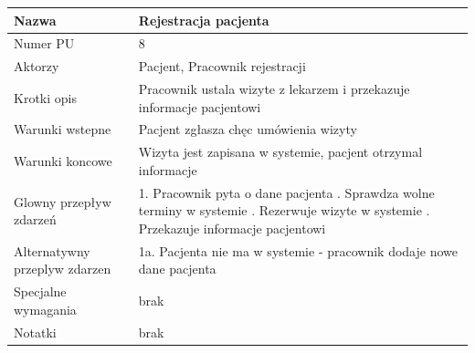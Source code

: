 \documentclass{article}
\begin{document}
\noindent
\begin{tabular}{|m{10em}|m{30em}|}
        \hline
        Nazwa & Rejestracja pacjenta \\
        \hline
        Numer PU & 8\\
        \hline
        Aktorzy & Pacjent, Pracownik rejestracji\\
        \hline
        Krotki opis & Pracownik ustala wizyte z lekarzem i przekazuje informacje pacjentowi\\
        \hline
        Warunki wstepne & Pacjent zgłasza chęc umówienia wizyty\\
        \hline
        Warunki koncowe & Wizyta jest zapisana w systemie, pacjent otrzymal informacje\\
        \hline
        Glowny przepływ zdarzeń & 1. Pracownik pyta o dane pacjenta \newline
                                 2. Sprawdza wolne terminy w systemie \newline
                                 3. Rezerwuje wizyte w systemie \newline
                                 4. Przekazuje informacje pacjentowi  \\
        \hline
        Alternatywny przeplyw zdarzen &  1a. Pacjenta nie ma w systemie - pracownik dodaje nowe dane pacjenta\\
        \hline
        Specjalne wymagania & brak\\
        \hline
        Notatki& brak\\
        \hline
\end{tabular}

\vspace{1cm}
\end{document}
